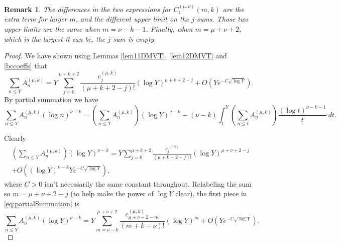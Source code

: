 \documentclass[12pt, a4paper,reqno]{amsart}
\newtheorem*{remark*}{Remark}
\theoremstyle{definition}
\numberwithin{equation}{section}
\begin{document}
\begin{remark*}
The differences in the two expressions for $C_1^{(\mu,\nu)}(m,k)$ are the extra term for larger $m$, and the different upper limit on the $j$-sums. Those two upper limits are the same when $m = \nu-k-1$. Finally, when $m=\mu+\nu+2$, which is the largest it can be, the $j$-sum is empty.
\end{remark*}

\begin{proof}
We have shown using Lemmas \ref{lem11DMVT}, \ref{lem12DMVT} and \ref{bccoeffs} that
\begin{equation*}
    \sum_{n\le Y}A_n^{(\mu,k)}=Y\sum_{j=0}^{\mu+k+2}\frac{c^{(\mu,k)}_{j}}{(\mu+k+2-j)!}(\log Y)^{\mu+k+2-j}+O\left(Ye^{-C\sqrt{\log Y}}\right).
\end{equation*}
By partial summation we have
\begin{equation}\label{eq:partialSummation}
    \sum_{n \le Y} A_n^{(\mu,k)} (\log n)^{\nu-k} = \left(\sum_{n\le Y}A_n^{(\mu,k)}\right)(\log Y)^{\nu-k}-(\nu-k)\int_1^Y \left(\sum_{n\le t}A_n^{(\mu,k)}\right)\frac{(\log t)^{\nu-k-1}}{t}\ dt.
\end{equation}

Clearly
\begin{multline*}
\left(\sum_{n\le Y}A_n^{(\mu,k)}\right)(\log Y)^{\nu-k} = Y \sum_{j=0}^{\mu+k+2} \frac{c^{(\mu,k)}_{j}}{(\mu+k+2-j)!} (\log Y)^{\mu+\nu+2-j}\\
+O\left((\log Y)^{\nu-k}Ye^{-C\sqrt{\log Y}}\right),
\end{multline*}
where $C>0$ isn't necessarily the same constant throughout. Relabeling the sum so $m = \mu+\nu+2-j$ (to help make the power of $\log Y$ clear), the first piece in \eqref{eq:partialSummation} is
\begin{equation}\label{eq:partial1}
\sum_{n\le Y}A_n^{(\mu,k)} (\log Y)^{\nu-k} = Y\sum_{m=\nu-k}^{\mu+\nu+2} \frac{c^{(\mu,k)}_{\mu+\nu+2-m}}{(m+k-\nu)!}(\log Y)^{m}
+O\left(Ye^{-C\sqrt{\log Y}}\right).
\end{equation}


\end{proof}
\end{document}
